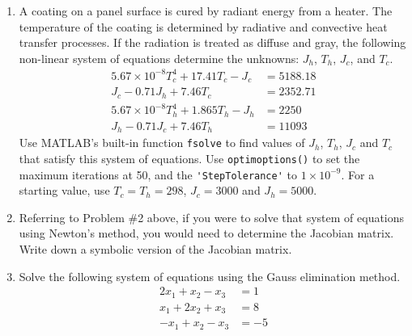 \begin{fullwidth}
\begin{enumerate}
\end{enumerate}
\vspace{1.0cm}



\begin{enumerate}[resume]
\item A coating on a panel surface is cured by radiant energy from a heater. The temperature of the coating is determined by radiative and convective heat transfer processes.  If the radiation is treated as diffuse and gray, the following non-linear system of equations determine the unknowns: $J_h$, $T_h$, $J_c$, and $T_c$.
\begin{align*}
5.67 \times 10^{-8} T^4_{c} + 17.41 T_c - J_c &= 5188.18 \\
J_c - 0.71 J_h + 7.46 T_c &= 2352.71 \\
5.67 \times 10^{-8} T^4_{h} + 1.865 T_h - J_h &= 2250 \\
J_h - 0.71 J_c + 7.46 T_h &= 11093
\end{align*}
Use MATLAB's built-in function \lstinline[style=myMatlab]{fsolve} to find values of $J_h$, $T_h$, $J_c$ and $T_c$ that satisfy this system of equations.  Use \lstinline[style=myMatlab]{optimoptions()} to set the maximum iterations at 50, and the \lstinline[style=myMatlab]{'StepTolerance'} to $1 \times 10^{-9}$.  For a starting value, use $T_c = T_h = 298$, $J_c = 3000$ and $J_h = 5000$.


\vspace{2.0cm}

\item Referring to Problem \#2 above, if you were to solve that system of equations using Newton's method, you would need to determine the Jacobian matrix.  Write down a symbolic version of the Jacobian matrix.

\vspace{2.0cm}

\item Solve the following system of equations using the Gauss elimination method.
\begin{align*}
2x_1 + x_2 - x_3 &= 1\\
x_1 + 2x_2 + x_3 &= 8\\
-x_1 + x_2 - x_3 &= -5\\
\end{align*}

\end{enumerate}


\vspace{2.0cm}


\end{fullwidth}
